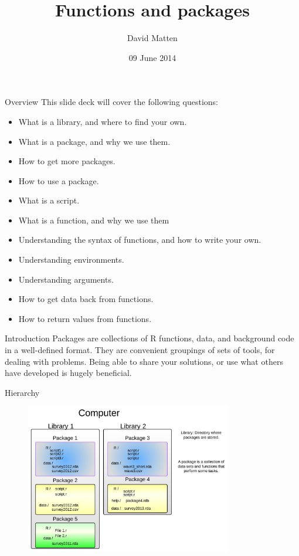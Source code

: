 \documentclass{beamer}\usepackage[]{graphicx}\usepackage[]{color}
\begin{document}
\title{Functions and packages}
\author{David Matten}
\date{09 June 2014}

\maketitle


\begin{frame}[fragile]{Overview}
This slide deck will cover the following questions:
\begin{itemize}
\item What is a library, and where to find your own.
\item What is a package, and why we use them.
\item How to get more packages.
\item How to use a package.
\item What is a script.
\item What is a function, and why we use them
\item Understanding the syntax of functions, and how to write your own.
\item Understanding environments.
\item Understanding arguments.
\item How to get data back from functions.
\item How to return values from functions.
\end{itemize}

\end{frame}


\begin{frame}[fragile]{Introduction}
Packages are collections of R functions, data, and background code in a well-defined format.
\linebreak
\linebreak
They are convenient groupings of sets of tools, for dealing with problems.
\linebreak
\linebreak
Being able to share your solutions, or use what others have developed is hugely beneficial.
\end{frame}


\begin{frame}[fragile]{Hierarchy}

\begin{figure}[ht!]
\centering
\includegraphics[width=90mm]{pictures/library_function_heirachy.jpeg}
\label{overflow}
\end{figure}

\end{frame}
\end{document}
